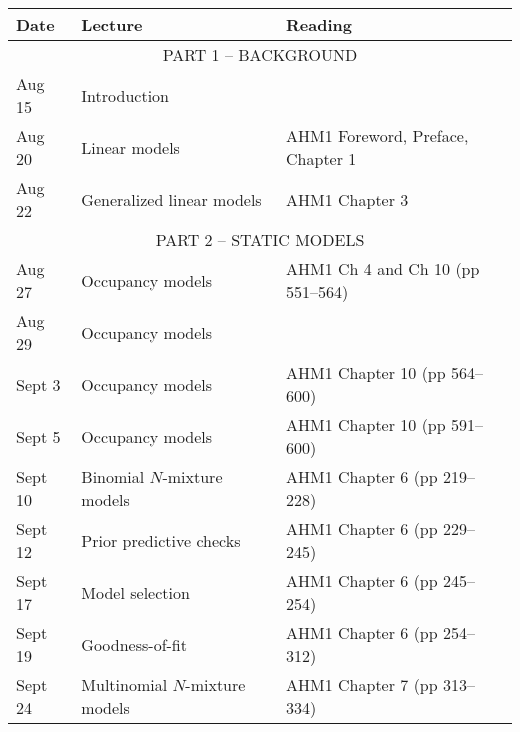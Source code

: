 \documentclass[12pt]{article}
\begin{document}
\begin{center}
\begin{tabular}[c]{lll}
\hline \hline
{\bf Date} & {\bf Lecture}                                & {\bf Reading}                                         \\
\hline
           \multicolumn{3}{c}{PART 1 -- BACKGROUND}                                                               \\
\hline
Aug 15     & Introduction                                 &                                                       \\
\hline
Aug 20     & Linear models                                & AHM1 Foreword, Preface, Chapter 1                     \\
Aug 22     & Generalized linear models                    & AHM1 Chapter 3                                        \\
\hline
           \multicolumn{3}{c}{PART 2 -- STATIC MODELS}                                                            \\
\hline
Aug 27     & Occupancy models                             & AHM1 Ch 4 and Ch 10 (pp 551--564)                     \\
Aug 29     & Occupancy models                             &                                                       \\
\hline
Sept 3     & Occupancy models                             & AHM1 Chapter 10 (pp 564--600)                         \\
Sept 5     & Occupancy models                             & AHM1 Chapter 10 (pp 591--600)                         \\
\hline
Sept 10    & Binomial $N$-mixture models                  & AHM1 Chapter 6 (pp 219--228)                          \\
Sept 12    & Prior predictive checks                      & AHM1 Chapter 6 (pp 229--245)                          \\
\hline
Sept 17    & Model selection                              & AHM1 Chapter 6 (pp 245--254)                          \\
Sept 19    & Goodness-of-fit                              & AHM1 Chapter 6 (pp 254--312)                          \\
\hline
Sept 24    & Multinomial $N$-mixture models               & AHM1 Chapter 7 (pp 313--334)                          \\

\end{tabular}
\end{center}
\end{document}
